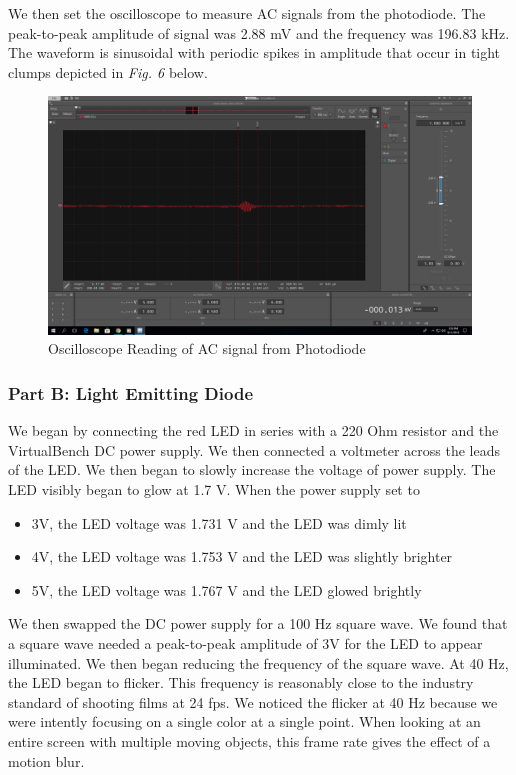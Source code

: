 \documentclass[10pt]{article}
\begin{document}
We then set the oscilloscope to measure AC signals from the photodiode. The peak-to-peak amplitude of signal was 2.88 mV and the frequency was 196.83 kHz. The waveform is sinusoidal with periodic spikes in amplitude that occur in tight clumps depicted in \textit{Fig. 6} below. 
\begin{center}
	\begin{figure} [H]
		\centering
		\includegraphics[scale = 0.22]{images/zoom.png}
		\caption{Oscilloscope Reading of AC signal from Photodiode}
		\label{fig:zoom}
	\end{figure}
\end{center}

\subsubsection{Part B: Light Emitting Diode}
We began by connecting the red LED in series with a 220 Ohm resistor and the VirtualBench DC power supply. We then connected a voltmeter across the leads of the LED. We then began to slowly increase the voltage of power supply. The LED visibly began to glow at 1.7 V. When the power supply set to 
\begin{itemize}
	\item 3V, the LED voltage was 1.731 V and the LED was dimly lit
	\item 4V, the LED voltage was 1.753 V and the LED was slightly brighter
	\item 5V, the LED voltage was 1.767 V and the LED glowed brightly
\end{itemize}

We then swapped the DC power supply for a 100 Hz square wave. We found that a square wave needed a peak-to-peak amplitude of 3V for the LED to appear illuminated. We then began reducing the frequency of the square wave. At 40 Hz, the LED began to flicker. This frequency is reasonably close to the industry standard of shooting films at 24 fps. We noticed the flicker at 40 Hz because we were intently focusing on a single color at a single point. When looking at an entire screen with multiple moving objects, this frame rate gives the effect of a motion blur. 
\end{document}
